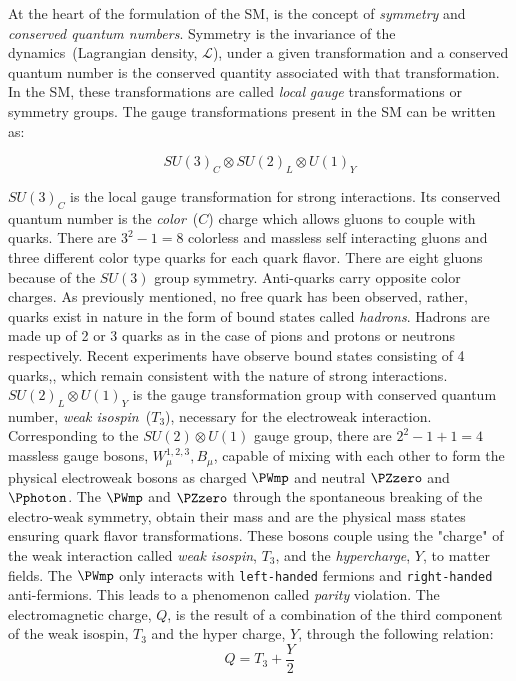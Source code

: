  At the heart of the formulation of the SM, is the concept of \textit{symmetry} and \textit{conserved quantum numbers}. Symmetry is the invariance of the dynamics~(Lagrangian density, $\mathcal{L}$), under a given transformation and a conserved quantum number is the conserved quantity associated with that transformation. In the SM, these transformations are called \textit{local} \textit{gauge} transformations or symmetry groups. %
The gauge transformations present in the SM can be written as:

\begin{equation}
SU(3)_{C} \otimes SU(2)_{L} \otimes U(1)_{Y}
\end{equation}

$SU(3)_{C}$ is the local gauge transformation for strong interactions. Its conserved quantum number is the \textit{color}~($C$) charge which allows gluons to couple with quarks. There are $3^{2}-1 = 8$ colorless and massless self interacting gluons and three different color type quarks for each quark flavor. There are eight gluons because of the $SU(3)$ group symmetry. Anti-quarks carry opposite color charges. As previously mentioned, no free quark has been observed, rather, quarks exist in nature in the form of bound states called \textit{hadrons}. Hadrons are made up of 2 or 3 quarks as in the case of pions and protons or neutrons respectively. Recent experiments have observe bound states consisting of 4 quarks,\cite{Quarks}, which remain consistent with the nature of strong interactions.
\newline
 $SU(2)_{L} \otimes U(1)_{Y}$ is the gauge transformation group with conserved quantum number, \textit{weak isospin}~($T_{3}$), necessary for the electroweak interaction. Corresponding to the $SU(2)\otimes U(1)$ gauge group, there are $2^{2} -1 + 1 = 4$ massless gauge bosons, $W^{1,2,3}_{\mu}, B_{\mu} $, capable of mixing with each other to form the physical electroweak bosons as charged $\PWmp$ and neutral $\PZzero$ and $\Pphoton$. The $\PWmp$ and $\PZzero$ through the spontaneous breaking of the electro-weak symmetry, obtain their mass and are the physical mass states ensuring quark flavor transformations. These bosons couple using the "charge" of the weak interaction called \textit{weak isospin}, $T_{3}$, and the \textit{hypercharge}, $Y$, to matter fields. The $\PWmp$ only interacts with \texttt{left-handed} fermions and \texttt{right-handed} anti-fermions. This leads to a phenomenon called \textit{parity} violation. The electromagnetic charge, $Q$, is the result of a combination of the third component of the weak isospin, $T_{3}$ and the hyper charge, $Y$, through the following relation:
\begin{equation}
Q = T_{3} + \frac{Y}{2}
\end{equation}

